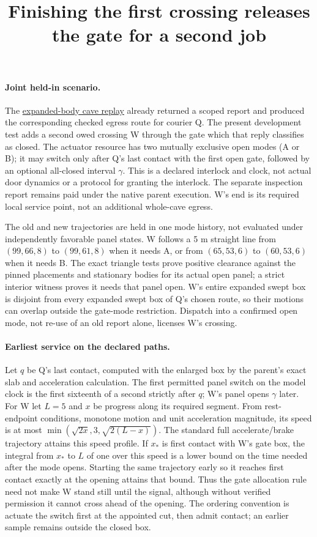 \documentclass{article}
\title{Finishing the first crossing releases the gate for a second job}
\author{}
\date{}
\begin{document}
\maketitle
\paragraph{Joint held-in scenario.}
The
\href{https://github.com/eternal-november/eos-research-programmes/pull/806}{expanded-body cave replay}
already returned a scoped report and produced the corresponding
checked egress route for courier Q. The present development test
adds a second owed crossing W through the gate which that reply
classifies as closed. The actuator resource has two mutually exclusive
open modes (A or B); it may switch only after Q's last contact with
the first open gate, followed by an optional all-closed interval
\(\gamma\). This is a declared interlock and clock, not actual door
dynamics or a protocol for granting the interlock. The separate
inspection report remains paid under the native parent execution.
W's end is its required local service point, not an additional
whole-cave egress.

The old and new trajectories are held in one mode history, not
evaluated under independently favorable panel states. W follows a
5 m straight line from \((99,66,8)\) to \((99,61,8)\) when it needs
A, or from \((65,53,6)\) to \((60,53,6)\) when it needs B.
The exact triangle tests prove positive clearance against the pinned
placements and stationary bodies for its actual open panel; a
strict interior witness proves it needs that panel open. W's
entire expanded swept box is disjoint from every expanded swept
box of Q's chosen route, so their motions can overlap outside
the gate-mode restriction. Dispatch into a confirmed open mode,
not re-use of an old report alone, licenses W's crossing.

\paragraph{Earliest service on the declared paths.}
Let \(q\) be Q's last contact, computed with the enlarged box by
the parent's exact slab and acceleration calculation. The first
permitted panel switch on the model clock is the first sixteenth
of a second strictly after \(q\); W's panel opens \(\gamma\) later.
For W let \(L=5\) and \(x\) be progress along its required segment.
From rest-endpoint conditions, monotone motion and unit acceleration
magnitude, its speed is at most
\(\min(\sqrt{2x},3,\sqrt{2(L-x)})\).
The standard full accelerate/brake trajectory attains this speed
profile. If \(x_*\) is first contact with W's gate box, the integral
from \(x_*\) to \(L\) of one over this speed is a lower bound
on the time needed after the mode opens. Starting the same trajectory
early so it reaches first contact exactly at the opening attains
that bound. Thus the gate allocation rule need not make W stand
still until the signal, although without verified permission
it cannot cross ahead of the opening. The ordering convention is
actuate the switch first at the appointed cut, then admit contact;
an earlier sample remains outside the closed box.
\end{document}
